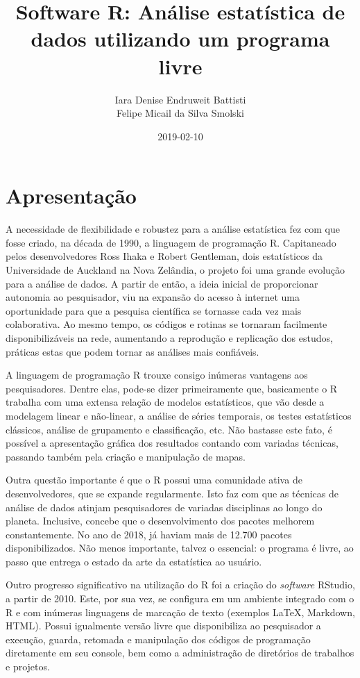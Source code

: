 \documentclass[12pt,brazil,oneside]{book}
\title{Software R: Análise estatística de dados utilizando um programa livre}
\author{Iara Denise Endruweit Battisti \\ Felipe Micail da Silva Smolski}
\date{2019-02-10}
\begin{document}
\maketitle

{
\setcounter{tocdepth}{1}
\tableofcontents
}
\hypertarget{apresentacao}{%
\chapter*{Apresentação}\label{apresentacao}}

A necessidade de flexibilidade e robustez para a análise estatística fez com que fosse criado, na década de 1990, a linguagem de programação R. Capitaneado pelos desenvolvedores Ross Ihaka e Robert Gentleman, dois estatísticos da Universidade de Auckland na Nova Zelândia, o projeto foi uma grande evolução para a análise de dados. A partir de então, a ideia inicial de proporcionar autonomia ao pesquisador, viu na expansão do acesso à internet uma oportunidade para que a pesquisa científica se tornasse cada vez mais colaborativa. Ao mesmo tempo, os códigos e rotinas se tornaram facilmente disponibilizáveis na rede, aumentando a reprodução e replicação dos estudos, práticas estas que podem tornar as análises mais confiáveis.

A linguagem de programação R trouxe consigo inúmeras vantagens aos pesquisadores. Dentre elas, pode-se dizer primeiramente que, basicamente o R trabalha com uma extensa relação de modelos estatísticos, que vão desde a modelagem linear e não-linear, a análise de séries temporais, os testes estatísticos clássicos, análise de grupamento e classificação, etc. Não bastasse este fato, é possível a apresentação gráfica dos resultados contando com variadas técnicas, passando também pela criação e manipulação de mapas.

Outra questão importante é que o R possui uma comunidade ativa de desenvolvedores, que se expande regularmente. Isto faz com que as técnicas de análise de dados atinjam pesquisadores de variadas disciplinas ao longo do planeta. Inclusive, concebe que o desenvolvimento dos pacotes melhorem constantemente. No ano de 2018, já haviam mais de 12.700 pacotes disponibilizados. Não menos importante, talvez o essencial: o programa é livre, ao passo que entrega o estado da arte da estatística ao usuário.

Outro progresso significativo na utilização do R foi a criação do \emph{software} RStudio, a partir de 2010. Este, por sua vez, se configura em um ambiente integrado com o R e com inúmeras linguagens de marcação de texto (exemplos LaTeX, Markdown, HTML). Possui igualmente versão livre que disponibiliza ao pesquisador a execução, guarda, retomada e manipulação dos códigos de programação diretamente em seu console, bem como a administração de diretórios de trabalhos e projetos.
\end{document}
